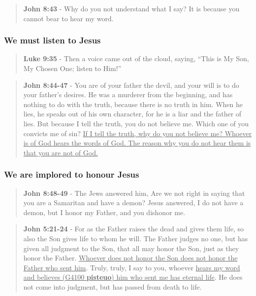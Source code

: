\documentclass[11pt]{article}
\begin{document}
\begin{quote}
\textbf{John 8:43} - Why do you not understand what I say? It is because you cannot bear to hear my word.
\end{quote}

\subsubsection{We must listen to Jesus}
\label{sec:org996c051}
\begin{quote}
\textbf{Luke 9:35} - Then a voice came out of the cloud, saying, “This is My Son, My Chosen One; listen to Him!”
\end{quote}

\begin{quote}
\textbf{John 8:44-47} - You are of your father the devil, and your will is to do your father's desires. He was a murderer from the beginning, and has nothing to do with the truth, because there is no truth in him. When he lies, he speaks out of his own character, for he is a liar and the father of lies. But because I tell the truth, you do not believe me. Which one of you convicts me of sin? \uline{If I tell the truth, why do you not believe me? Whoever is of God hears the words of God. The reason why you do not hear them is that you are not of God.}
\end{quote}

\subsubsection{We are implored to honour Jesus}
\label{sec:org45877ff}
\begin{quote}
\textbf{John 8:48-49} - The Jews answered him, Are we not right in saying that you are a Samaritan and have a demon? Jesus answered, I do not have a demon, but I honor my Father, and you dishonor me.
\end{quote}

\begin{quote}
\textbf{John 5:21-24} - For as the Father raises the dead and gives them life, so also the Son gives life to whom he will. The Father judges no one, but has given all judgment to the Son, that all may honor the Son, just as they honor the Father. \uline{Whoever does not honor the Son does not honor the Father who sent him}. Truly, truly, I say to you, whoever \uline{hears my word and believes (G4100 \textbf{pisteuo}) him who sent me has eternal life}. He does not come into judgment, but has passed from death to life.
\end{quote}
\end{document}
